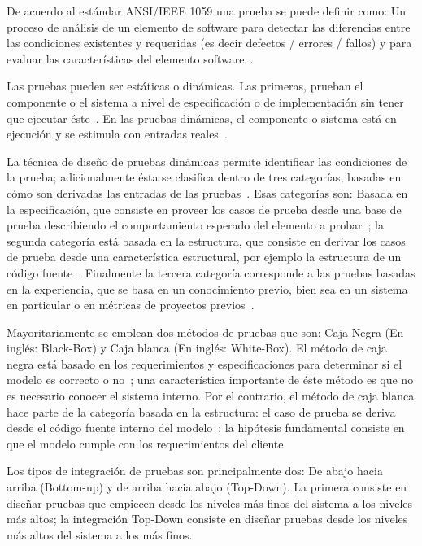 De acuerdo al est\'andar ANSI/IEEE 1059 una prueba se puede definir como: Un 
proceso de an\'alisis de un elemento de software para detectar las diferencias 
entre las condiciones existentes y requeridas (es decir defectos / errores / 
fallos) y para evaluar las caracter\'isticas del elemento 
software~\cite{IEEE1994}.

Las pruebas pueden ser est\'aticas o din\'amicas. Las primeras, prueban el 
componente o el sistema a nivel de especificaci\'on o de implementaci\'on sin 
tener que ejecutar \'este~\cite{Ammann2008,Homes2013,ISOIEC29119}. En 
las pruebas din\'amicas, el componente o sistema est\'a en ejecuci\'on y se 
estimula con entradas reales~\cite{Ammann2008,Homes2013}. 

La t\'ecnica de dise\~no de pruebas din\'amicas permite identificar las 
condiciones de la prueba; adicionalmente \'esta se clasifica dentro de tres 
categor\'ias, basadas en c\'omo son derivadas las entradas de las 
pruebas~\cite{ISOIEC29119}. Esas categor\'ias son: Basada en la 
especificaci\'on, 
que consiste en proveer los casos de prueba desde una base de prueba 
describiendo el comportamiento esperado del elemento a 
probar~\cite{ISOIEC29119}; la segunda categor\'ia est\'a basada en la 
estructura, que 
consiste en derivar los casos de prueba desde una caracter\'istica estructural, 
por ejemplo la estructura de un c\'odigo fuente~\cite{ISOIEC29119}. Finalmente 
la tercera categor\'ia corresponde a las pruebas basadas en la experiencia, que 
se basa en un conocimiento previo, bien sea en un sistema en particular o en 
m\'etricas de proyectos previos~\cite{Homes2013}.

Mayoritariamente se emplean dos m\'etodos de pruebas que son: Caja Negra (En 
ingl\'es: Black-Box) y Caja blanca (En ingl\'es: White-Box). El m\'etodo de caja 
negra est\'a basado en los requerimientos y especificaciones para determinar si 
el modelo es correcto o no~\cite{Homes2013,Ammann2008}; una caracter\'istica 
importante de \'este m\'etodo es que no es necesario conocer el sistema interno. 
Por el contrario, el m\'etodo de caja blanca hace parte de la categor\'ia basada 
en la estructura: el caso de prueba se deriva desde el c\'odigo fuente interno 
del modelo~\cite{Ammann2008}; la hip\'otesis fundamental consiste en que el 
modelo cumple con los requerimientos del cliente.  

Los tipos de integraci\'on de pruebas son principalmente dos: De abajo hacia 
arriba (Bottom-up) y de arriba hacia abajo (Top-Down). La primera consiste en 
dise\~nar pruebas que empiecen desde los niveles m\'as finos del sistema a los 
niveles m\'as altos; la integraci\'on Top-Down consiste en dise\~nar pruebas 
desde los niveles m\'as altos del sistema a los m\'as finos.

